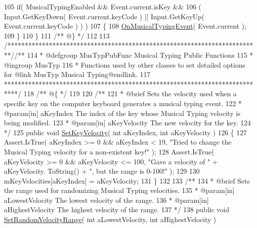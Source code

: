 \begin{DoxyCodeInclude}
105         \textcolor{keywordflow}{if}( MusicalTypingEnabled && Event.current.isKey &&
106             ( Input.GetKeyDown( Event.current.keyCode ) || Input.GetKeyUp( Event.current.keyCode ) ) )
107         \{
108             \hyperlink{group___mus_typ_handlers_ga391a3d207136b7eb0e734e289b520188}{OnMusicalTypingEvent}( Event.current );
109         \}
110     \}\textcolor{comment}{}
111 \textcolor{comment}{    /** @\} */}
112 
113     \textcolor{comment}{/*************************************************************************/}\textcolor{comment}{/** }
114 \textcolor{comment}{    * @defgroup MusTypPubFunc Musical Typing Public Functions}
115 \textcolor{comment}{    * @ingroup MusTyp}
116 \textcolor{comment}{    * Functions used by other classes to set detailed options for @link MusTyp Musical Typing@endlink.}
117 \textcolor{comment}{    ****************************************************************************/}\textcolor{comment}{}
118 \textcolor{comment}{    /** @\{ */}
119 \textcolor{comment}{}
120 \textcolor{comment}{    /**}
121 \textcolor{comment}{     * @brief Sets the velocity used when a specific key on the computer keyboard generates a musical
       typing event.}
122 \textcolor{comment}{     * @param[in] aKeyIndex The index of the key whose Musical Typing velocity is being modified.}
123 \textcolor{comment}{     * @param[in] aKeyVelocity The new velocity for the key.}
124 \textcolor{comment}{    */}
125     \textcolor{keyword}{public} \textcolor{keywordtype}{void} \hyperlink{group___mus_typ_pub_func_ga02f86b46bb63dc751b669035b7aa5ce0}{SetKeyVelocity}( \textcolor{keywordtype}{int} aKeyIndex, \textcolor{keywordtype}{int} aKeyVelocity )
126     \{
127         Assert.IsTrue( aKeyIndex >= 0 && aKeyIndex < 19, \textcolor{stringliteral}{"Tried to change the Musical Typing velocity for a
       non-existent key!"} );
128         Assert.IsTrue( aKeyVelocity >= 0 && aKeyVelocity <= 100, \textcolor{stringliteral}{"Gave a velocity of "} + aKeyVelocity.
      ToString() + \textcolor{stringliteral}{", but the range is 0-100!"} );
129 
130         mKeyVelocities[aKeyIndex] = aKeyVelocity;
131     \}
132 \textcolor{comment}{}
133 \textcolor{comment}{    /**}
134 \textcolor{comment}{     * @brief Sets the range used for randomizing Musical Typing velocities.}
135 \textcolor{comment}{     * @param[in] aLowestVelocity The lowest velocity of the range.}
136 \textcolor{comment}{     * @param[in] aHighestVelocity The highest velocity of the range.}
137 \textcolor{comment}{    */}
138     \textcolor{keyword}{public} \textcolor{keywordtype}{void} \hyperlink{group___mus_typ_pub_func_gaf6ba35e3a081cff62fa963ed32d218c8}{SetRandomVelocityRange}( \textcolor{keywordtype}{int} aLowestVelocity, \textcolor{keywordtype}{int} aHighestVelocity )

\end{DoxyCodeInclude}
